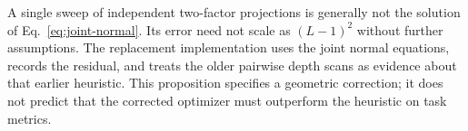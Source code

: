A single sweep of independent two-factor projections is generally not the
solution of Eq.~\eqref{eq:joint-normal}. Its error need not scale as
$(L-1)^2$ without further assumptions. The replacement implementation uses
the joint normal equations, records the residual, and treats the older
pairwise depth scans as evidence about that earlier heuristic. This
proposition specifies a geometric correction; it does not predict that
the corrected optimizer must outperform the heuristic on task metrics.
